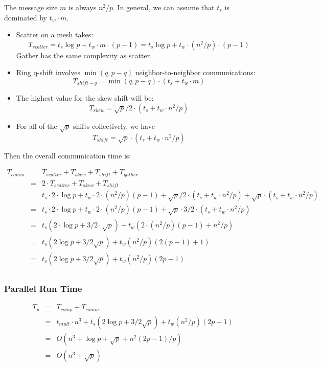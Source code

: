 \documentclass{article}
\begin{document}
The message size $m$ is always $n^2/p$. In general, we can assume that $t_s$ is
dominated by $t_w \cdot m$.

\begin{itemize}
	\item Scatter on a mesh takes: $$T_{{scatter}} = t_s
\log{p} + t_w \cdot m  \cdot (p-1) = t_s \log{p} + t_w \cdot (n^2/p) \cdot
(p-1)$$
Gather has the same complexity as scatter.

\item Ring q-shift involves $\min(q, p-q)$ neighbor-to-neighbor communications:
$$T_{{shift-q}} = \min(q,p-q) \cdot (t_s + t_w \cdot m)$$

\item The highest value for the skew shift will be:
$$T_{{skew}} = \sqrt{p}/2 \cdot (t_s + t_w \cdot n^2/p)$$

\item For all of the $\sqrt{p}$ shifts collectively, we have
$$T_{{shift}} = \sqrt{p} \cdot (t_s + t_w \cdot n^2/p)$$

\end{itemize}

Then the overall communication time is:

\begin{eqnarray*}
T_{{comm}} 	&=& T_{{scatter}} + T_{{skew}} + T_{{shift}} + T_{{gather}} \\
			&=& 2 \cdot T_{{scatter}} + T_{{skew}} + T_{{shift}}  \\
			&=& t_s \cdot 2 \cdot \log{p} + t_w \cdot 2 \cdot (n^2/p)(p-1) + \sqrt{p}/2 \cdot (t_s + t_w \cdot n^2/p) + \sqrt{p} \cdot (t_s + t_w \cdot n^2/p) \\ 
			&=& t_s \cdot 2 \cdot \log{p} + t_w \cdot 2 \cdot (n^2/p)(p-1) + \sqrt{p} \cdot 3/2 \cdot (t_s + t_w \cdot n^2/p) \\ 
			&=& t_s(2 \cdot \log{p} + 3/2 \cdot \sqrt{p}) + t_w (2 \cdot (n^2/p)(p-1) + n^2/p) \\ 
			&=& t_s (2 \log{p} + 3/2 \sqrt{p}) + t_w (n^2/p)(2(p-1) + 1) \\
			&=& t_s (2 \log{p} + 3/2 \sqrt{p}) + t_w (n^2/p)(2p-1) \\
\end{eqnarray*}


\subsubsection{Parallel Run Time}

\begin{eqnarray*}
T_p 	&=& T_{{comp}} + T_{{comm}} \\
		&=& t_{{mult}} \cdot n^3 + t_s (2 \log{p} + 3/2 \sqrt{p}) + t_w (n^2/p)(2p-1) \\
		&=& O(n^3 + \log{p} + \sqrt{p} + n^2 (2p-1)/p) \\
		&=& O(n^3 + \sqrt{p}) \\
\end{eqnarray*}
\end{document}
